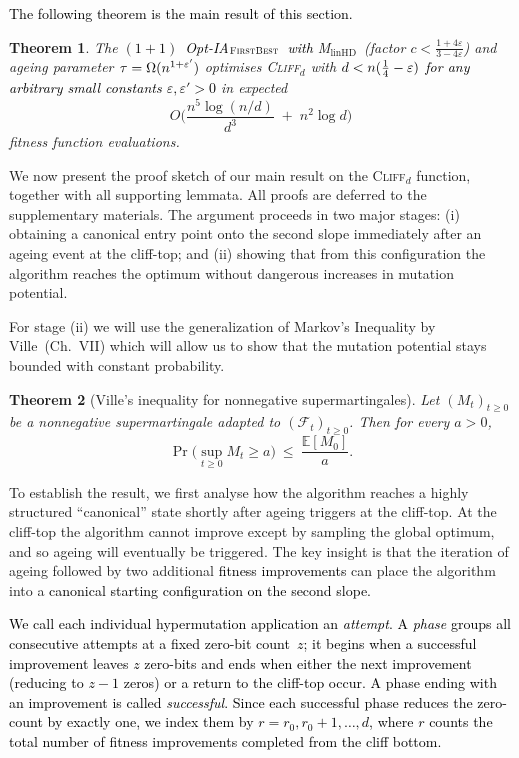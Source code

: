 \documentclass[lettersize,journal]{IEEEtran}
\newcommand{\rev}[1]{\textcolor{black}{#1}}
\newcommand{\rerev}[1]{\textcolor{black}{#1}}
\newcommand{\EE}{\mathbb{E}}
\newcommand{\cliff}{\textsc{Cliff}$_d$}
\newcommand{\linHD}{M$_{\text{linHD}}$}
\newcommand{\firstBest}{$(1+1)$~Opt-IA$_{\textsc{FirstBest}}$}
\newtheorem{theorem}{Theorem}
\begin{document}
 
{
\rev{The following theorem is the main result of this section.}
\begin{theorem}\label{th:expoHD-cliff}
	The \textcolor{black}{\firstBest~with} \linHD\ (factor $c<\tfrac{1+4\varepsilon}{3-4\varepsilon}$) and ageing parameter $\tau=\Omega(n^{1+\rerev{\varepsilon'}})$
	optimises \cliff{} with $d<n(\tfrac{1}{4}-\rerev{\varepsilon})$ \rerev{for any arbitrary small constants $\varepsilon,\varepsilon'>0$} in expected
	\[
	O\!\Big(\frac{n^{5}\log(n/d)}{d^{3}} \;+\; n^{2}\log d\Big)
	\]
	fitness function evaluations.
\end{theorem}


We now present the proof sketch of our main result on the  \cliff{} function, together with 
all supporting lemmata.  All proofs are deferred to the supplementary materials. The argument proceeds in two 
major stages: (i) obtaining a canonical entry point onto the second slope 
immediately after an ageing event at the cliff-top; and (ii) showing that from 
this configuration the algorithm reaches the optimum without dangerous increases in mutation potential.

For stage (ii) we will use the generalization of Markov's Inequality by Ville~\cite{Doob1953}(Ch.~VII) which will allow us to show that the mutation potential stays bounded with constant probability.
\begin{theorem}[Ville's inequality for nonnegative supermartingales]\label{thm:ville}
	Let $(M_t)_{t\ge 0}$ be a nonnegative supermartingale adapted to $(\mathcal F_t)_{t\ge 0}$. 
	Then for every $a>0$,
	\[
	\Pr\!\big(\sup_{t\ge 0} M_t \ge a\big)\ \le\ \frac{\EE[M_0]}{a}.
	\]
\end{theorem}



To establish the result, we first analyse how the algorithm reaches a highly 
structured ``canonical'' state shortly after ageing triggers at the cliff-top.
At the cliff-top the algorithm cannot improve except by sampling the global 
optimum, and so ageing will eventually be triggered.  The key insight is that 
the iteration of ageing followed by two additional \textcolor{black}{fitness improvements} can place the 
algorithm into a
\textcolor{black}{canonical
starting configuration on the second slope.}

\rerev{We call each individual hypermutation application an \emph{attempt}.
A \emph{phase} groups all consecutive attempts at a fixed zero-bit count~$z$;
it begins when a successful improvement leaves $z$ zero-bits and ends when
either the next improvement (reducing to $z-1$ zeros) or a
 return to the cliff-top occur.
A phase ending with an improvement is called \emph{successful}.
Since each successful phase reduces the zero-count by exactly one, we
index them by $r = r_0, r_0+1, \dots, d$, where $r$ counts the total
number of fitness improvements completed from the cliff bottom.}

}
\end{document}
